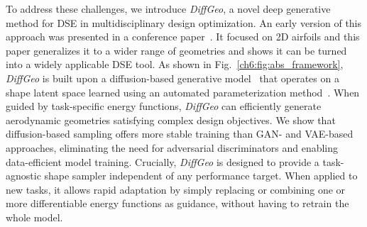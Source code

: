 To address these challenges, we introduce \textit{DiffGeo}, a novel deep generative method for DSE in multidisciplinary design optimization. An early version of this approach was presented in a conference paper~\cite{aa.Wei2024}. It focused on 2D airfoils and this paper generalizes it to a wider range of geometries and shows it can be turned into a widely applicable DSE tool. As shown in Fig.~\ref{ch6:fig:abs_framework}, \textit{DiffGeo} is built upon a diffusion-based generative model~\cite{ai.SohlDickstein2015} that operates on a shape latent space learned using an automated parameterization method~\cite{aa.Wei2023,aa.Wei2023b}. When guided by task-specific energy functions, \textit{DiffGeo} can efficiently generate aerodynamic geometries satisfying complex design objectives.  We show that diffusion-based sampling offers more stable training than  GAN- and VAE-based approaches,  eliminating the need for adversarial discriminators and enabling data-efficient model training. Crucially, \textit{DiffGeo} is designed to provide a task-agnostic shape sampler independent of any performance target. When applied to new tasks, it allows rapid adaptation by simply replacing or combining one or more differentiable energy functions as guidance, without having to retrain the whole model. 

